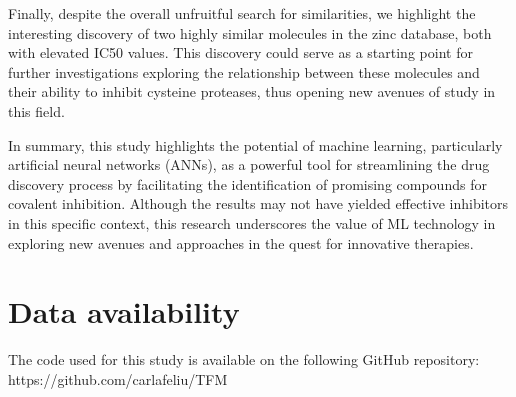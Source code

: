 \documentclass[final,times,twocolumn,article]{elsarticle}
\begin{document}
Finally, despite the overall unfruitful search for similarities, we highlight the interesting discovery of two highly similar molecules in the zinc database, both with elevated IC50 values. This discovery could serve as a starting point for further investigations exploring the relationship between these molecules and their ability to inhibit cysteine proteases, thus opening new avenues of study in this field.

In summary, this study highlights the potential of machine learning, particularly artificial neural networks (ANNs), as a powerful tool for streamlining the drug discovery process by facilitating the identification of promising compounds for covalent inhibition. Although the results may not have yielded effective inhibitors in this specific context, this research underscores the value of ML technology in exploring new avenues and approaches in the quest for innovative therapies.

\appendix

\section{Data availability}

The code used for this study is available on the following GitHub repository: https://github.com/carlafeliu/TFM


\end{document}
